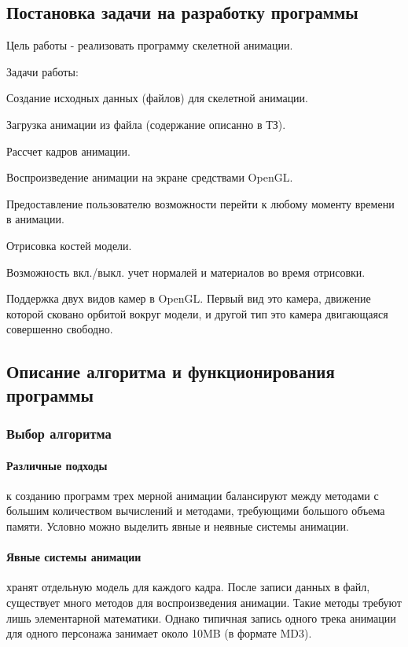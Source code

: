\subsection{Постановка задачи на разработку программы}
    Цель работы - реализовать программу скелетной анимации.

\bigskip
Задачи работы:

\smallskip
\begin{my_enumerate}
\item Создание исходных данных (файлов) для скелетной анимации.
\item Загрузка анимации из файла (содержание описанно в ТЗ).
\item Рассчет кадров анимации.
\item Воспроизведение анимации на экране средствами OpenGL.
\item Предоставление пользователю возможности перейти к любому моменту времени в анимации.
\item Отрисовка костей модели.
\item Возможность вкл./выкл. учет нормалей и материалов во время отрисовки.
\item Поддержка двух видов камер в OpenGL. Первый вид это камера, движение которой сковано орбитой вокруг модели, и другой тип это камера двигающаяся совершенно свободно.
\end{my_enumerate}


\subsection{Описание алгоритма и функционирования программы}


\subsubsection{Выбор алгоритма}

\paragraph{Различные подходы}
к созданию программ трех мерной анимации балансируют между методами с большим количеством вычислений и методами, требующими большого объема памяти. Условно можно выделить явные и неявные системы анимации.

\paragraph{Явные системы анимации} хранят отдельную модель для каждого кадра.
После записи данных в файл, существует много методов для воспроизведения анимации.
Такие методы требуют лишь элементарной математики.
Однако типичная запись одного трека анимации для одного персонажа занимает около 10MB (в формате MD3).

